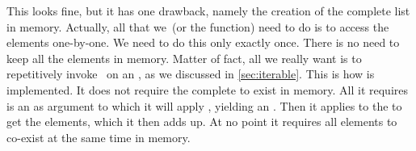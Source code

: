 This looks fine, but it has one drawback, namely the creation of the complete list in memory.
Actually, all that we~(or the  function) need to do is to access the elements one-by-one.
We need to do this only exactly once.
There is no need to keep all the elements in memory.
Matter of fact, all we really want is to repetitively invoke~ on an , as we discussed in \cref{sec:iterable}.
This is how  is implemented.
It does not require the complete  to exist in memory.
All it requires is an  as argument to which it will apply , yielding an .
Then it applies  to the  to get the elements, which it then adds up.
At no point it requires all elements to co-exist at the same time in memory.

